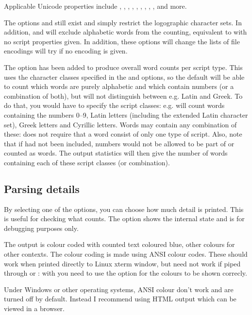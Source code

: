 \documentclass{article}
\begin{document}
Applicable Unicode properties include , , , , , , , , , and more.

The options  and  still exist and simply restrict the logographic character sets. In addition,  and  will exclude alphabetic words from the counting, equivalent to  with no script properties given. In addition, these options will change the lists of file encodings \TeXcount{} will try if no encoding is given.

The option  has been added to produce overall word counts per script type. This uses the character classes specified in the  and  options, so the default will be able to count which words are purely alphabetic and which contain numbers (or a combination of both), but will not distinguish between e.g. Latin and Greek. To do that, you would have to specify the script classes: e.g.
will count words containing the numbers 0--9, Latin letters (including the extended Latin character set), Greek letters and Cyrillic letters. Words may contain any combination of these: \TeXcount{} does not require that a word consist of only one type of script. Also, note that if  had not been included, numbers would not be allowed to be part of or counted as words. The output statistics will then give the number of words containing each of these script classes (or combination).

\subsection{Parsing details}

By selecting one of the  options, you can choose how much detail is printed. This is useful for checking what \TeXcount{} counts. The option  shows the internal state and is for debugging purposes only.

The output is colour coded with counted text coloured blue, other colours for other contexts. The colour coding is made using ANSI colour codes. These should work when printed directly to Linux xterm window, but need not work if piped through  or : with  you need to use the option  for the colours to be shown correcly.

Under Windows or other operating systems, ANSI colour don't work and are turned off by default. Instead I recommend using HTML output which can be viewed in a browser.
\end{document}
